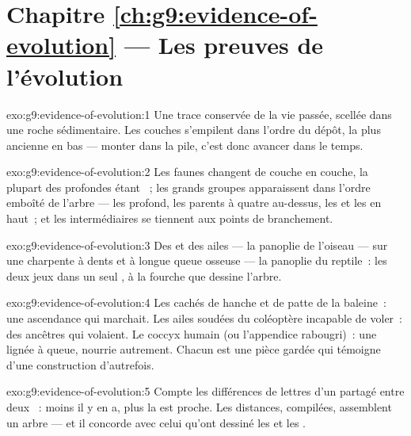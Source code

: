 \section*{Chapitre \ref{ch:g9:evidence-of-evolution} --- Les preuves de l'évolution}

\begin{solution}{exo:g9:evidence-of-evolution:1}
Une trace conservée de la vie passée, scellée dans une roche
sédimentaire. Les couches s'empilent dans l'ordre du dépôt,
la plus ancienne en bas --- monter dans la pile, c'est donc
avancer dans le temps.
\end{solution}

\begin{solution}{exo:g9:evidence-of-evolution:2}
Les faunes changent de couche en couche, la plupart des
 profondes étant ~; les grands groupes
apparaissent dans l'ordre emboîté de l'arbre --- les
 profond, les parents à quatre  au-dessus,
les  et les  en haut~; et les
intermédiaires se tiennent aux points de branchement.
\end{solution}

\begin{solution}{exo:g9:evidence-of-evolution:3}
Des  et des ailes --- la panoplie de l'oiseau --- sur
une charpente à dents et à longue queue osseuse --- la
panoplie du reptile~: les deux jeux dans un seul , à
la fourche que dessine l'arbre.
\end{solution}

\begin{solution}{exo:g9:evidence-of-evolution:4}
Les  cachés de hanche et de patte de la baleine~: une
ascendance qui marchait. Les ailes soudées du coléoptère
incapable de voler~: des ancêtres qui volaient. Le coccyx
humain (ou l'appendice rabougri)~: une lignée à queue,
nourrie autrement. Chacun est une pièce gardée qui témoigne
d'une construction d'autrefois.
\end{solution}

\begin{solution}{exo:g9:evidence-of-evolution:5}
Compte les différences de lettres d'un  partagé entre
deux ~: moins il y en a, plus la  est proche.
Les distances, compilées, assemblent un arbre --- et il
concorde avec celui qu'ont dessiné les  et les .
\end{solution}

